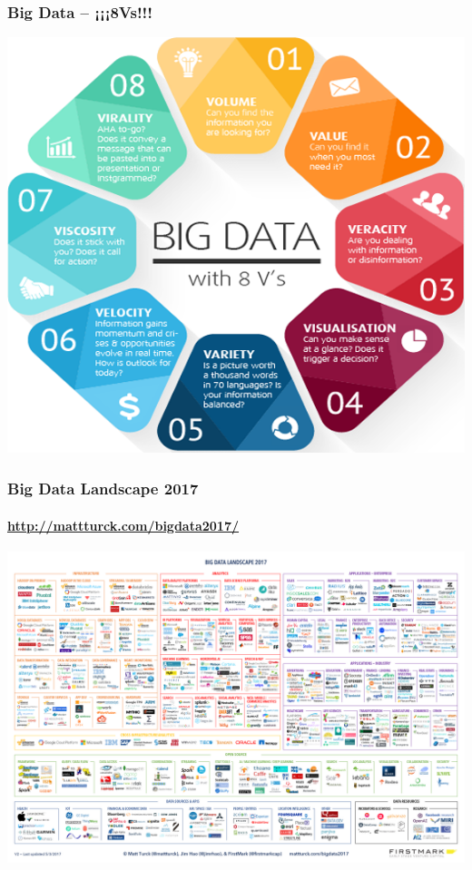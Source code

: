 \documentclass[14pt]{beamer}
\begin{document}
\begin{frame}
  \frametitle{Big Data -- ¡¡¡8Vs!!!}
  \centering\includegraphics[width=.8\textwidth]{img/8V}
\end{frame}

\begin{frame}
  \frametitle{Big Data Landscape 2017}
  \framesubtitle{\url{http://mattturck.com/bigdata2017/}}
  \centering\includegraphics[width=\textwidth]{img/Big-Data-Landscape}
\end{frame}
\end{document}
